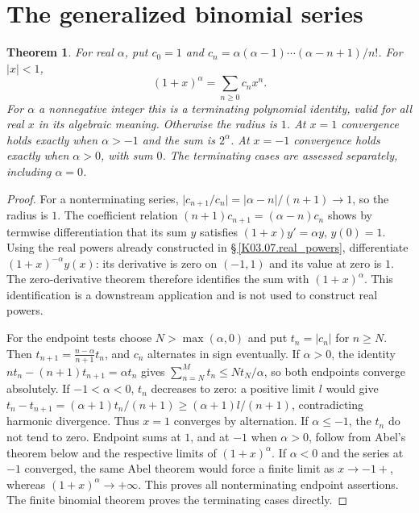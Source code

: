 \documentclass[11pt,oneside,a4paper]{book}
\newtheorem{theorem}{Theorem}[chapter]
\theoremstyle{definition}
\theoremstyle{remark}
\newcommand{\abs}[1]{\lvert#1\rvert}
\newcommand{\KEntry}[2]{\Needspace{7\baselineskip}\section{#2}\label{#1}{\small\sffamily\color{black!60}\detokenize{#1}}\par}
\newcommand{\KRef}[1]{\hyperref[#1]{\S\,\ref*{#1}}}
\begin{document}
\KEntry{K03.13.binomial}{The generalized binomial series}
\begin{theorem}
For real $\alpha$, put $c_0=1$ and $c_n=\alpha(\alpha-1)\cdots(\alpha-n+1)/n!$. For $\abs x<1$,
\[(1+x)^\alpha=\sum_{n\geq0}c_nx^n.\]
For $\alpha$ a nonnegative integer this is a terminating polynomial identity, valid for all real $x$ in its algebraic meaning. Otherwise the radius is $1$. At $x=1$ convergence holds exactly when $\alpha>-1$ and the sum is $2^\alpha$. At $x=-1$ convergence holds exactly when $\alpha>0$, with sum $0$. The terminating cases are assessed separately, including $\alpha=0$.
\end{theorem}
\begin{proof}
For a nonterminating series, $\abs{c_{n+1}/c_n}=\abs{\alpha-n}/(n+1)\to1$, so the radius is $1$. The coefficient relation $(n+1)c_{n+1}=(\alpha-n)c_n$ shows by termwise differentiation that its sum $y$ satisfies $(1+x)y'=\alpha y$, $y(0)=1$. Using the real powers already constructed in \KRef{K03.07.real_powers}, differentiate $(1+x)^{-\alpha}y(x)$: its derivative is zero on $(-1,1)$ and its value at zero is $1$. The zero-derivative theorem therefore identifies the sum with $(1+x)^\alpha$. This identification is a downstream application and is not used to construct real powers.

For the endpoint tests choose $N>\max(\alpha,0)$ and put $t_n=\abs{c_n}$ for $n\geq N$. Then $t_{n+1}=\frac{n-\alpha}{n+1}t_n$, and $c_n$ alternates in sign eventually. If $\alpha>0$, the identity $nt_n-(n+1)t_{n+1}=\alpha t_n$ gives $\sum_{n=N}^Mt_n\leq Nt_N/\alpha$, so both endpoints converge absolutely. If $-1<\alpha<0$, $t_n$ decreases to zero: a positive limit $l$ would give $t_n-t_{n+1}=(\alpha+1)t_n/(n+1)\geq(\alpha+1)l/(n+1)$, contradicting harmonic divergence. Thus $x=1$ converges by alternation. If $\alpha\leq-1$, the $t_n$ do not tend to zero. Endpoint sums at $1$, and at $-1$ when $\alpha>0$, follow from Abel's theorem below and the respective limits of $(1+x)^\alpha$. If $\alpha<0$ and the series at $-1$ converged, the same Abel theorem would force a finite limit as $x\to-1+$, whereas $(1+x)^\alpha\to+\infty$. This proves all nonterminating endpoint assertions. The finite binomial theorem proves the terminating cases directly.
\end{proof}
\end{document}
